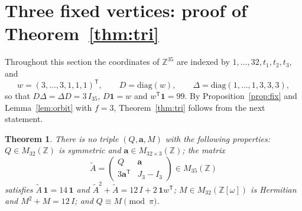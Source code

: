 \documentclass[11pt,a4paper]{article}
\newtheorem{theorem}{Theorem}[section]
\theoremstyle{remark}
\newcommand{\ZZ}{\mathbb{Z}}
\newcommand{\one}{\mathbf{1}}
\newcommand{\tp}{\mathsf{T}}
\newcommand{\av}{\mathbf{a}}
\newcommand{\tA}{\widetilde{A}}
\begin{document}
\section{Three fixed vertices: proof of Theorem~\ref{thm:tri}}\label{sec:tri}

Throughout this section the coordinates of $\ZZ^{35}$ are indexed by $1,\dots,32,t_1,t_2,t_3$, and
\[
w=(3,\dots,3,1,1,1)^{\tp},\qquad D=\mathrm{diag}(w),\qquad \Delta=\mathrm{diag}(1,\dots,1,3,3,3),
\]
so that $D\Delta=\Delta D=3\,I_{35}$, $D\one=w$ and $w^{\tp}\one=99$. By Proposition~\ref{prop:fix} and
Lemma~\ref{lem:orbit} with $f=3$, Theorem~\ref{thm:tri} follows from the next statement.

\begin{theorem}\label{thm:trimat}
There is no triple $(Q,\av,M)$ with the following properties:
$Q\in M_{32}(\ZZ)$ is symmetric and $\av\in M_{32\times3}(\ZZ)$;
the matrix
\[
\tA=\begin{pmatrix}Q&\av\\ 3\av^{\tp}&J_3-I_3\end{pmatrix}\in M_{35}(\ZZ)
\]
satisfies $\tA\,\one=14\,\one$ and $\tA^2+\tA=12\,I+2\,\one w^{\tp}$;
$M\in M_{32}(\ZZ[\omega])$ is Hermitian and $M^2+M=12\,I$;
and $Q\equiv M\pmod\pi$.
\end{theorem}
\end{document}
